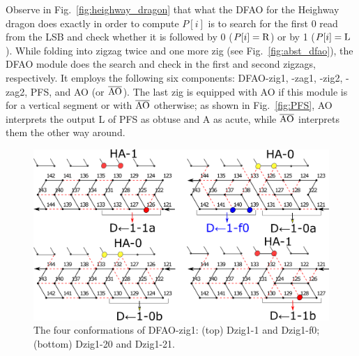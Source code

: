 Observe in Fig.~\ref{fig:heighway_dragon} that what the DFAO for the Heighway dragon does exactly in order to compute $P[i]$ is to search for the first 0 read from the LSB and check whether it is followed by 0 ($P[i] = {\rm R}$) or by 1 ($P[i] = {\rm L}$). 
While folding into zigzag twice and one more zig (see Fig.~\ref{fig:abst_dfao}), the DFAO module does the search and check in the first and second zigzags, respectively.
It employs the following six components: DFAO-zig1, -zag1, -zig2, -zag2, PFS, and AO (or $\overline{\rm AO}$). 
The last zig is equipped with AO if this module is for a vertical segment or with $\overline{\rm AO}$ otherwise; as shown in Fig.~\ref{fig:PFS}, AO interprets the output L of PFS as obtuse and A as acute, while $\overline{\rm AO}$ interprets them the other way around. 

\begin{figure}
\vspace*{-5mm}
\centering
\includegraphics[width=\linewidth]{pic/DFAO-zig1.png}  
\caption{The four conformations of DFAO-zig1: (top) Dzig1-1 and Dzig1-f0; (bottom) Dzig1-20 and Dzig1-21.}
\label{fig:DFAO-zig1}
\vspace*{-3mm}
\end{figure}

